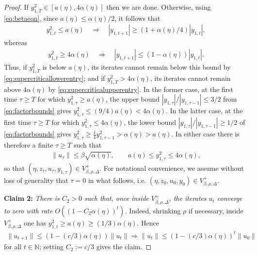 \documentclass{article}
\newcommand{\NB}{\mathbb{N}}
\theoremstyle{plain}
\theoremstyle{definition}
\theoremstyle{remark}
\begin{document}
\begin{proof}
    If $y_{1,T}^2\in[a(\eta),4\alpha(\eta)]$ then we are done. Otherwise, using \eqref{eq:betaeqn}, since $a(\eta)\leq \alpha(\eta)/2$, it follows that
    \begin{align}
        y_{1,t}^2
        \leq a(\eta)
        \quad\Longrightarrow\quad
        |y_{1,t+1}|\geq(1+\alpha(\eta)/4)|y_{1,t}|,
        \label{eq:supercriticallowerentry}
    \end{align}
    whereas
    \begin{align}
        y_{1,t}^2\geq4\alpha(\eta)
        \quad\Longrightarrow\quad
        |y_{1,t+1}|\leq(1-\alpha(\eta))|y_{1,t}|.
        \label{eq:supercriticalupperentry}
    \end{align}
    Thus, if $y_{1,T}^2$ is below $a(\eta)$, its iterates cannot remain below this bound by \eqref{eq:supercriticallowerentry}; and if $y_{1,T}^2>4\alpha(\eta)$, its iterates cannot remain above $4\alpha(\eta)$ by \eqref{eq:supercriticalupperentry}. In the former case, at the first time $\tau\geq T$ for which $y_{1,\tau}^2\geq a(\eta)$, the upper bound $|y_{1,\tau}|/|y_{1,\tau-1}|\leq3/2$ from \eqref{eq:factorbounds} gives $y_{1,\tau}^2\leq (9/4)a(\eta)<4\alpha(\eta)$. In the latter case, at the first time $\tau\geq T$ for which $y_{1,\tau}^2\leq4\alpha(\eta)$, the lower bound $|y_{1,\tau}|/|y_{1,\tau-1}|\geq1/2$ of \eqref{eq:factorbounds} gives $y_{1,\tau}^2\geq\frac14y_{1,\tau-1}^2>\alpha(\eta)>a(\eta)$. In either case there is therefore a finite $\tau\geq T$ such that
    \begin{align}
        \|u_\tau\|\leq \beta\sqrt{\alpha(\eta)},
        \qquad
        a(\eta)
        \leq y_{1,\tau}^2\leq4\alpha(\eta),
    \end{align}
    so that $(\eta,z_\tau,u_\tau,y_{1,\tau})\in V^+_{\beta,\rho,\Delta}$. For notational convenience, we assume without loss of generality that $\tau = 0$ in what follows, i.e. $(\eta,z_0,u_0,y_0)\in V^+_{\beta,\rho,\Delta}$.

    \noindent\textbf{Claim 2: }\emph{There is $C_2>0$ such that, once inside $V^+_{\beta,\rho,\Delta}$, the iterates $u_t$ converge to zero with rate $O((1-C_2\alpha(\eta))^t)$.} Indeed, shrinking $\rho$ if necessary, inside $V^+_{\beta,\rho,\Delta}$ one has $y_{1,t}^2\geq a(\eta)\geq (1/3)\alpha(\eta)$. Hence
    \begin{align}
    \|u_{t+1}\|\leq (1-(c/3)\alpha(\eta))\|u_{t}\|\Rightarrow \|u_{t}\|\leq (1-(c/3)\alpha(\eta))^t\|u_{0}\|
    \end{align}
    for all $t\in\NB$; setting $C_2:=c/3$ gives the claim.
    

\end{proof}
\end{document}
